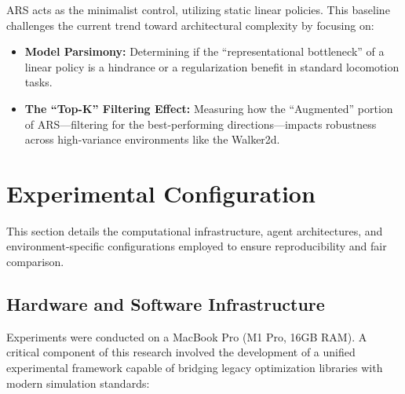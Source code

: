 ARS acts as the minimalist control, utilizing static linear policies. This baseline challenges the current trend toward architectural complexity by focusing on:

\begin{itemize}
    \item \textbf{Model Parsimony:} Determining if the ``representational bottleneck'' of a linear policy is a hindrance or a regularization benefit in standard locomotion tasks.
    
    \item \textbf{The ``Top-K'' Filtering Effect:} Measuring how the ``Augmented'' portion of ARS—filtering for the best-performing directions—impacts robustness across high-variance environments like the Walker2d.
\end{itemize}

\section{Experimental Configuration}
This section details the computational infrastructure, agent architectures, and environment-specific configurations employed to ensure reproducibility and fair comparison.

\subsection{Hardware and Software Infrastructure}

Experiments were conducted on a MacBook Pro (M1 Pro, 16GB RAM). A critical component of this research involved the development of a unified experimental framework capable of bridging legacy optimization libraries with modern simulation standards:

